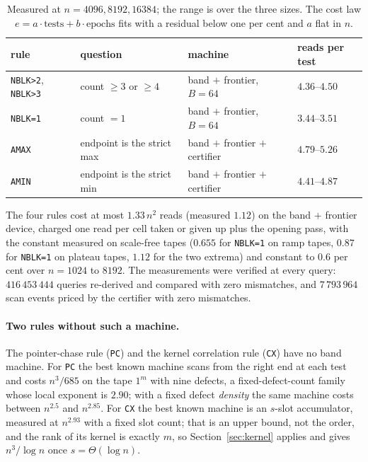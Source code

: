 \documentclass[11pt]{article}
\theoremstyle{remark}
\begin{document}
\begin{table}[h]
\centering
\small
\begin{tabular}{@{}llll@{}}
\toprule
rule & question & machine & reads per test \\
\midrule
\texttt{NBLK>2}, \texttt{NBLK>3} & count $\ge3$ or $\ge4$ & band $+$ frontier, $B=64$ & $4.36$--$4.50$\\
\texttt{NBLK=1} & count $=1$ & band $+$ frontier, $B=64$ & $3.44$--$3.51$\\
\texttt{AMAX} & endpoint is the strict max & band $+$ frontier $+$ certifier & $4.79$--$5.26$\\
\texttt{AMIN} & endpoint is the strict min & band $+$ frontier $+$ certifier & $4.41$--$4.87$\\
\bottomrule
\end{tabular}
\caption{Measured at $n=4096,8192,16384$; the range is over the three sizes. The cost law
$e=a\cdot\text{tests}+b\cdot\text{epochs}$ fits with a residual below one per cent and $a$ flat in $n$.}
\end{table}

The four rules cost at most $1.33\,n^{2}$ reads (measured $1.12$) on the band $+$ frontier device,
charged one read per cell taken or given up plus the opening pass, with the constant measured on
scale-free tapes
($0.655$ for \texttt{NBLK=1} on ramp tapes, $0.87$ for \texttt{NBLK=1} on plateau tapes, $1.12$
for the two extrema) and constant to
$0.6$ per cent over $n=1024$ to $8192$. The measurements were verified at every query:
$416\,453\,444$ queries re-derived and compared with zero mismatches, and $7\,793\,964$ scan events
priced by the certifier with zero mismatches.

\paragraph{Two rules without such a machine.} The pointer-chase rule (\texttt{PC}) and the kernel
correlation rule (\texttt{CX}) have no band machine. For \texttt{PC} the best known machine scans
from the right end at each test and costs $n^{3}/685$ on the tape $1^{m}$ with nine defects, a
fixed-defect-count family whose local exponent is $2.90$; with a fixed defect \emph{density} the
same machine costs between $n^{2.5}$ and $n^{2.85}$. For \texttt{CX} the best known machine is an
$s$-slot accumulator, measured at $n^{2.93}$ with a fixed slot count; that is an upper bound, not
the order, and the rank of its kernel is exactly $m$, so Section~\ref{sec:kernel} applies and gives
$n^{3}/\log n$ once $s=\Theta(\log n)$.
\end{document}
